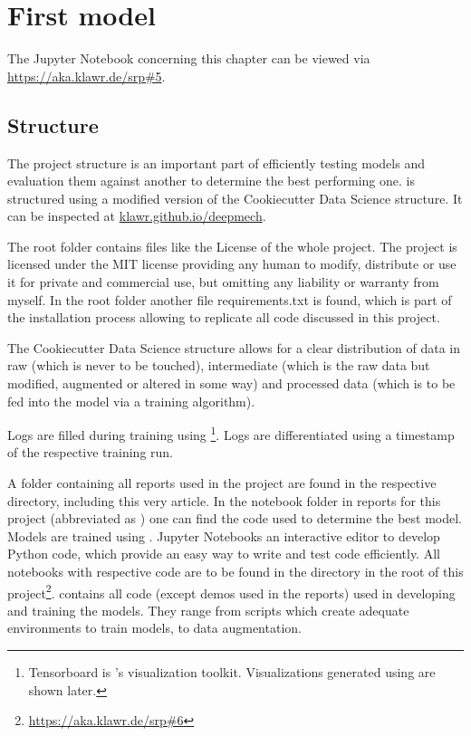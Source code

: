 \section{First model}

The Jupyter Notebook concerning this chapter can be viewed via \url{https://aka.klawr.de/srp\#5}.

\subsection{Structure}
The project structure is an important part of efficiently testing models and evaluation them against another to determine the best performing one.
 is structured using a modified version of the Cookiecutter Data Science \cite{drivendata2019} structure. It can be inspected at \url{klawr.github.io/deepmech}.

The root folder contains files like the License of the whole project.
The project is licensed under the MIT license providing any human to modify, distribute or use it for private and commercial use, but omitting any liability or warranty from myself.
In the root folder another file requirements.txt is found, which is part of the installation process allowing to replicate all code discussed in this project.

The Cookiecutter Data Science structure allows for a clear distribution of data in raw (which is never to be touched), intermediate (which is the raw data but modified, augmented or altered in some way) and processed data (which is to be fed into the model via a training algorithm).

Logs are filled during training using \footnote{Tensorboard is 's visualization toolkit. Visualizations generated using  are shown later.}. Logs are differentiated using a timestamp of the respective training run.


A folder containing all reports used in the project are found in the respective directory, including this very article.
In the notebook folder in reports for this project (abbreviated as ) one can find the code used to determine the best model.
Models are trained using  \cite{Jupyter2019}.
Jupyter Notebooks an interactive editor to develop Python code, which provide an easy way to write and test code efficiently.
All notebooks with respective code are to be found in the  directory in the root of this project\footnote{\url{https://aka.klawr.de/srp\#6}}.
 contains all code (except demos used in the reports) used in developing and training the models. They range from scripts which create adequate environments to train models, to data augmentation.

